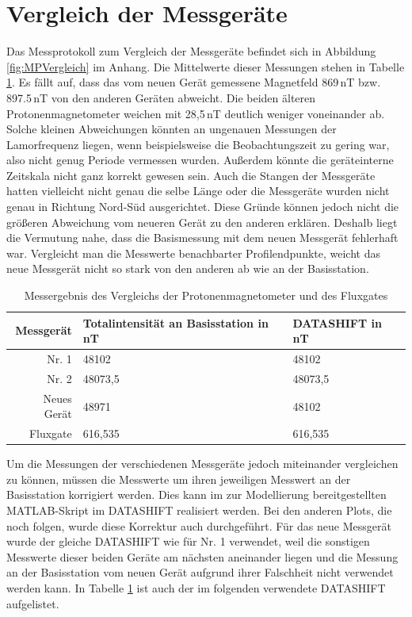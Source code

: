 \section{Vergleich der Messgeräte}

Das Messprotokoll zum Vergleich der Messgeräte befindet sich in Abbildung \ref{fig:MPVergleich} im Anhang. Die Mittelwerte dieser Messungen stehen in Tabelle \ref{tab:VergleichErgebnis}. Es fällt auf, dass das vom neuen Gerät gemessene Magnetfeld 869\,nT bzw. 897.5\,nT von den anderen Geräten abweicht. Die beiden älteren Protonenmagnetometer weichen mit 28,5\,nT deutlich weniger voneinander ab. Solche kleinen Abweichungen könnten an ungenauen Messungen der Lamorfrequenz liegen, wenn beispielsweise die Beobachtungszeit zu gering war, also nicht genug Periode vermessen wurden. Außerdem könnte die geräteinterne Zeitskala nicht ganz korrekt gewesen sein. Auch die Stangen der Messgeräte hatten vielleicht nicht genau die selbe Länge oder die Messgeräte wurden nicht genau in Richtung Nord-Süd ausgerichtet. Diese Gründe können jedoch nicht die größeren Abweichung vom neueren Gerät zu den anderen erklären. Deshalb liegt die Vermutung nahe, dass die Basismessung  mit dem neuen Messgerät fehlerhaft war. Vergleicht man die Messwerte benachbarter Profilendpunkte, weicht das neue Messgerät nicht so stark von den anderen ab wie an der Basisstation.


\begin{table}[!ht]
 \centering
 \caption{Messergebnis des Vergleichs der Protonenmagnetometer und des Fluxgates}
 \begin{tabular}{rll}
 \toprule
 Messgerät & Totalintensität an Basisstation in nT & DATASHIFT in nT \\
 \midrule
 Nr. 1 & 48102 &48102\\
 Nr. 2 & 48073,5 & 48073,5\\
 Neues Gerät & 48971 & 48102\\
 Fluxgate & 616,535 & 616,535\\
 \bottomrule
 \end{tabular}
\label{tab:VergleichErgebnis}
\end{table}

Um die Messungen der verschiedenen Messgeräte jedoch miteinander vergleichen zu können, müssen die Messwerte um ihren jeweiligen Messwert an der Basisstation korrigiert werden. Dies kann im zur Modellierung bereitgestellten MATLAB-Skript im DATASHIFT realisiert werden. Bei den anderen Plots, die noch folgen, wurde diese Korrektur auch durchgeführt. Für das neue Messgerät wurde der gleiche DATASHIFT wie für Nr. 1 verwendet, weil die sonstigen Messwerte dieser beiden Geräte am nächsten aneinander liegen und die Messung an der Basisstation vom neuen Gerät aufgrund ihrer Falschheit nicht verwendet werden kann. In Tabelle \ref{tab:VergleichErgebnis} ist auch der im folgenden verwendete DATASHIFT aufgelistet.

